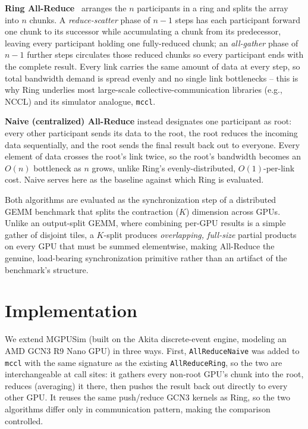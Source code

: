 \documentclass[conference]{IEEEtran}
\begin{document}
\textbf{Ring All-Reduce}~\cite{patarasuk2009} arranges the $n$ participants in a ring and splits the array into $n$ chunks. A \emph{reduce-scatter} phase of $n-1$ steps has each participant forward one chunk to its successor while accumulating a chunk from its predecessor, leaving every participant holding one fully-reduced chunk; an \emph{all-gather} phase of $n-1$ further steps circulates those reduced chunks so every participant ends with the complete result. Every link carries the same amount of data at every step, so total bandwidth demand is spread evenly and no single link bottlenecks -- this is why Ring underlies most large-scale collective-communication libraries (e.g., NCCL) and its simulator analogue, \texttt{mccl}.

\textbf{Naive (centralized) All-Reduce} instead designates one participant as root: every other participant sends its data to the root, the root reduces the incoming data sequentially, and the root sends the final result back out to everyone. Every element of data crosses the root's link twice, so the root's bandwidth becomes an $O(n)$ bottleneck as $n$ grows, unlike Ring's evenly-distributed, $O(1)$-per-link cost. Naive serves here as the baseline against which Ring is evaluated.

Both algorithms are evaluated as the synchronization step of a distributed GEMM benchmark that splits the contraction ($K$) dimension across GPUs. Unlike an output-split GEMM, where combining per-GPU results is a simple gather of disjoint tiles, a $K$-split produces \emph{overlapping, full-size} partial products on every GPU that must be summed elementwise, making All-Reduce the genuine, load-bearing synchronization primitive rather than an artifact of the benchmark's structure.

\section{Implementation}
\label{sec:implementation}

We extend MGPUSim (built on the Akita discrete-event engine, modeling an AMD GCN3 R9 Nano GPU) in three ways. First, \texttt{AllReduceNaive} was added to \texttt{mccl} with the same signature as the existing \texttt{AllReduceRing}, so the two are interchangeable at call sites: it gathers every non-root GPU's chunk into the root, reduces (averaging) it there, then pushes the result back out directly to every other GPU. It reuses the same push/reduce GCN3 kernels as Ring, so the two algorithms differ only in communication pattern, making the comparison controlled.
\end{document}
